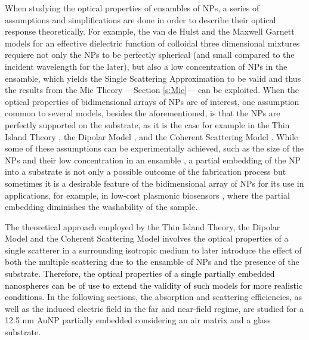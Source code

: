 
When studying the optical properties of ensambles of NPs, a series of assumptions and simplifications are done in order to describe their optical response theoretically. For example, the van de Hulst  \cite{hulst_light_1981} and the Maxwell Garnett \cite{sihvola_electromagnetic_2008} models for an effective dielectric function of colloidal three dimensional mixtures requiere not only the NPs to be perfectly spherical (and small compared to the incident wavelength for the later), but also a low concentration of NPs in the ensamble, which yields the Single Scattering Approximation to be valid and thus the results from the Mie Theory ---Section \ref{s:Mie}--- can be exploited. When the optical properties of bidimensional arrays of NPs are of interest, one assumption common to several models, besides the aforementioned, is that the NPs are  perfectly supported on the substrate, as it is the case for example in the Thin Island Theory \cite{bedeaux_optical_2004}, the Dipolar Model \cite{barrera1991optical}, and the Coherent Scattering Model \cite{garcia2012multiple}. While some of these assumptions can be experimentally achieved, such as the size of the NPs and their low concentration in an ensamble \cite{reyes2022enhancement}, a partial embedding of the NP into a substrate is not only a possible outcome of the fabrication process \cite{meng_anisotropic_2015} but sometimes it is a desirable feature of the bidimensional array of NPs for its use in applications, for example, in low-cost plasmonic biosensors \cite{moirangthem_enhanced_2012}, where the partial embedding diminishes the washability of the sample.

The theoretical approach employed by the Thin Island Theory, the Dipolar Model and the Coherent Scattering Model involves the optical properties of a single scatterer in a surrounding isotropic medium to later introduce the effect of both the multiple scattering due to the ensamble of NPs and the presence of the substrate. \textcolor{black}{Therefore, the optical properties of a single partially embedded nanospheres can be of use to extend the validity  of such models for more realistic conditions}. In the following sections, the absorption and scattering efficiencies, as well as the induced electric field in the far and near-field regime, are studied for a 12.5 nm AuNP partially embedded considering an air matrix and a glass substrate.
